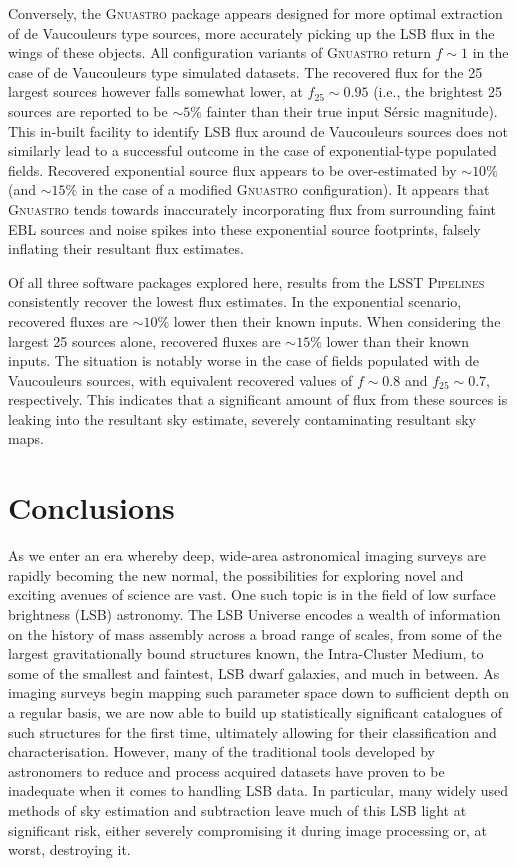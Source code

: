 \documentclass[fleqn,usenatbib,useAMS]{mnras}
\newcommand*{\about}{\mathord\sim}
\newcommand*{\Sersic}{S\'{e}rsic\xspace}
\newcommand*{\Gnuastro}{\textsc{Gnuastro}\xspace}
\newcommand*{\LSSTPs}{\textsc{LSST Pipelines}\xspace}
\begin{document}
Conversely, the \Gnuastro package appears designed for more optimal extraction of de Vaucouleurs type sources, more accurately picking up the LSB flux in the wings of these objects. All configuration variants of \Gnuastro return $f\sim1$ in the case of de Vaucouleurs type simulated datasets. The recovered flux for the 25 largest sources however falls somewhat lower, at $f_{25}\sim0.95$ (i.e., the brightest 25 sources are reported to be $\about5\%$ fainter than their true input \Sersic magnitude). This in-built facility to identify LSB flux around de Vaucouleurs sources does not similarly lead to a successful outcome in the case of exponential-type populated fields. Recovered exponential source flux appears to be over-estimated by $\about10\%$ (and $\about15\%$ in the case of a modified \Gnuastro configuration). It appears that \Gnuastro tends towards inaccurately incorporating flux from surrounding faint EBL sources and noise spikes into these exponential source footprints, falsely inflating their resultant flux estimates. 

Of all three software packages explored here, results from the \LSSTPs consistently recover the lowest flux estimates. In the exponential scenario, recovered fluxes are $\about10\%$ lower then their known inputs. When considering the largest 25 sources alone, recovered fluxes are $\about15\%$ lower than their known inputs. The situation is notably worse in the case of fields populated with de Vaucouleurs sources, with equivalent recovered values of $f\sim0.8$ and $f_{25}\sim0.7$, respectively. This indicates that a significant amount of flux from these sources is leaking into the resultant sky estimate, severely contaminating resultant sky maps.

\section{Conclusions}
\label{sec:conclusions}

As we enter an era whereby deep, wide-area astronomical imaging surveys are rapidly becoming the new normal, the possibilities for exploring novel and exciting avenues of science are vast. One such topic is in the field of low surface brightness (LSB) astronomy. The LSB Universe encodes a wealth of information on the history of mass assembly across a broad range of scales, from some of the largest gravitationally bound structures known, the Intra-Cluster Medium, to some of the smallest and faintest, LSB dwarf galaxies, and much in between. As imaging surveys begin mapping such parameter space down to sufficient depth on a regular basis, we are now able to build up statistically significant catalogues of such structures for the first time, ultimately allowing for their classification and characterisation. However, many of the traditional tools developed by astronomers to reduce and process acquired datasets have proven to be inadequate when it comes to handling LSB data. In particular, many widely used methods of sky estimation and subtraction leave much of this LSB light at significant risk, either severely compromising it during image processing or, at worst, destroying it. 
\end{document}
